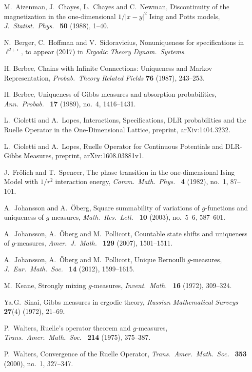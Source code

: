 \documentclass[11pt, a4paper, oneside]{article}
\theoremstyle{definition}
\theoremstyle{remark}
\begin{document}
\begin{thebibliography}{999}

 M.\ Aizenman, J.\ Chayes, L.\ Chayes and C.\ Newman,
  Discontinuity of the magnetization in the one-dimensional
  $1/|x-y|^2$ Ising and Potts models, {\em J.\ Statist.\ Phys.\ } {\bf
    50} (1988), 1--40.

 N.\ Berger, C.\ Hoffman and V.\ Sidoravicius,
  Nonuniqueness for specifications in $\ell^{2+\epsilon}$, to appear (2017)
  in {\em Ergodic Theory Dynam.\ Systems}.

 H. Berbee, Chains with Infinite Connections:
  Uniqueness and Markov Representation, {\em Probab.\ Theory Related
    Fields} {\bf 76} (1987), 243--253.
 
 H. Berbee, Uniqueness of Gibbs measures and
  absorption probabilities, {\em Ann.\ Probab.\ } {\bf 17} (1989),
  no.\ 4, 1416--1431.
 
 L.\ Cioletti and A.\ Lopes, Interactions,
  Specifications, DLR probabilities and the Ruelle Operator in the
  One-Dimensional Lattice, preprint, arXiv:1404.3232.
 
 L.\ Cioletti and A.\ Lopes, Ruelle Operator for
  Continuous Potentials and DLR-Gibbs Measures, preprint,
  arXiv:1608.03881v1.
 
 J.\ Fr\"olich and T.\ Spencer, The phase transition in
  the one-dimensional Ising Model with $1/r^2$ interaction energy,
  {\em Comm.\ Math.\ Phys.\ } {\bf 4} (1982), no.\ 1, 87--101.

 A.\ Johansson and A.\ \"Oberg, Square summability of
  variations of $g$-functions and uniqueness of $g$-measures, {\em
    Math.\ Res.\ Lett.\ } {\bf 10} (2003), no.\ 5--6, 587--601.
    
 A.\ Johansson, A.\ \"Oberg and M.\ Pollicott, Countable
  state shifts and uniqueness of $g$-measures, {\em Amer.\ J.\ Math.\
  } {\bf 129} (2007), 1501--1511.

 A.\ Johansson, A.\ \"Oberg and M.\ Pollicott, Unique
  Bernoulli $g$-measures, {\em J.\ Eur.\ Math.\ Soc.\ } {\bf 14}
  (2012), 1599--1615.
  
 M.\ Keane, Strongly mixing $g$-measures, {\em Invent.\
    Math.\ } {\bf 16} (1972), 309--324.

Ya.G.\ Sinai, Gibbs measures in ergodic theory, {\em Russian Mathematical Surveys} {\bf 27}(4) (1972), 21--69. 

\bibitem{walters1}
P.\ Walters, Ruelle's operator theorem and $g$-measures, {\em Trans.\ Amer.\ Math.\ Soc.\ } {\bf 214} (1975), 375--387.

\bibitem{walters3}
P.\ Walters, Convergence of the Ruelle Operator, {\em Trans.\ Amer.\ Math.\ Soc.\ } {\bf 353} (2000), 
no.\ 1, 327--347.
\end{thebibliography}
\end{document}
